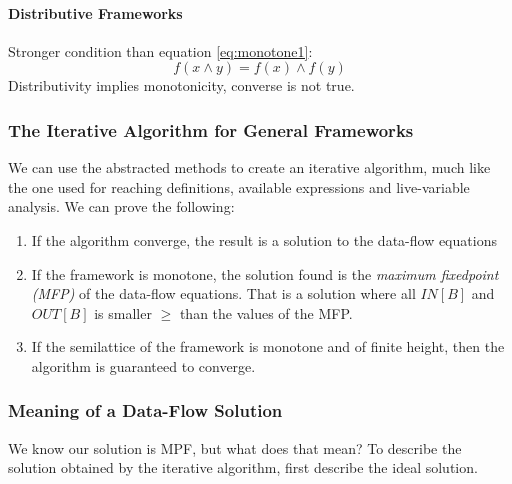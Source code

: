 \documentclass{article}
\begin{document}
\paragraph{Distributive Frameworks} %
\label{par:Distributive Frameworks}
Stronger condition than equation \ref{eq:monotone1}:
\begin{equation}
	f(x \wedge y) = f(x) \wedge f(y)
\end{equation}
Distributivity implies monotonicity, converse is not true.


\subsubsection{The Iterative Algorithm for General Frameworks} %
\label{ssub:The Iterative Algorithm for General Frameworks}
We can use the abstracted methods to create an iterative algorithm, much like the one used for reaching definitions, available expressions and live-variable analysis. We can prove the following:
\begin{enumerate}
	\item If the algorithm converge, the result is a solution to the data-flow equations
	\item If the framework is monotone, the solution found is the \emph{maximum fixedpoint (MFP)} of the data-flow equations. That is a solution where all $IN[B]$ and $OUT[B]$ is smaller $\ge$ than the values of the MFP.
	\item If the semilattice of the framework is monotone and of finite height, then the algorithm is guaranteed to converge.
\end{enumerate}

\subsubsection{Meaning of a Data-Flow Solution} %
\label{ssub:Meaning of a Data-Flow Solution}
We know our solution is MPF, but what does that mean? To describe the solution obtained by the iterative algorithm, first describe the ideal solution.
\end{document}
